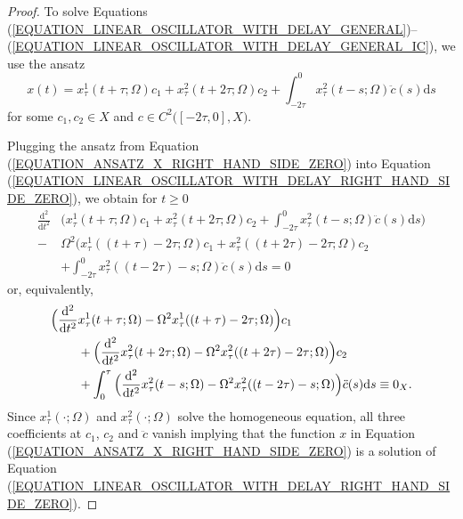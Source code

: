 \documentclass[12pt]{article}
\numberwithin{equation}{section}
\numberwithin{equation}{section}
\begin{document}
	\begin{proof}
		To solve Equations (\ref{EQUATION_LINEAR_OSCILLATOR_WITH_DELAY_GENERAL})--(\ref{EQUATION_LINEAR_OSCILLATOR_WITH_DELAY_GENERAL_IC}), we use the ansatz
		\begin{equation}
			x(t) = x^{1}_{\tau}(t + \tau; \Omega) c_{1} + x^{2}_{\tau}(t + 2\tau; \Omega) c_{2} + \int_{-2\tau}^{0} x^{2}_{\tau}(t - s; \Omega) \ddot{c}(s) \mathrm{d}s
			\label{EQUATION_ANSATZ_X_RIGHT_HAND_SIDE_ZERO}
		\end{equation}
		for some $c_{1}, c_{2} \in X$ and $c \in C^{2}\big([-2\tau, 0], X\big)$.

		Plugging the ansatz from Equation (\ref{EQUATION_ANSATZ_X_RIGHT_HAND_SIDE_ZERO}) into Equation (\ref{EQUATION_LINEAR_OSCILLATOR_WITH_DELAY_RIGHT_HAND_SIDE_ZERO}), we obtain for $t \geq 0$
		\begin{align*}
			\frac{\mathrm{d}^{2}}{\mathrm{d}t^{2}} 
			&\Big(x^{1}_{\tau}(t + \tau; \Omega) c_{1} + x^{2}_{\tau}(t + 2\tau; \Omega) c_{2} + \int_{-2\tau}^{0} x^{2}_{\tau}(t - s; \Omega) \ddot{c}(s) \mathrm{d}s\Big) \\
			-&\Omega^{2} \Big(x^{1}_{\tau}((t + \tau) - 2\tau; \Omega) c_{1} + x^{2}_{\tau}((t + 2\tau) - 2\tau; \Omega) c_{2} \\
			&+ \int_{-2\tau}^{0} x^{2}_{\tau}((t - 2\tau) - s; \Omega) \ddot{c}(s) \mathrm{d}s = 0
		\end{align*}
		or, equivalently,
		\begin{align*}
			\Big(\frac{\mathrm{d}^{2}}{\mathrm{d}t^{2}} &x^{1}_{\tau}(t + \tau; \Omega) - \Omega^{2} x^{1}_{\tau}((t + \tau) - 2\tau; \Omega)\Big) c_{1} \\
			&+ \Big(\frac{\mathrm{d}^{2}}{\mathrm{d}t^{2}} x^{2}_{\tau}(t + 2\tau; \Omega) - \Omega^{2} x^{2}_{\tau}((t + 2\tau) - 2\tau; \Omega)\Big) c_{2} \\
			&+ \int_{0}^{\tau} \Big(\frac{\mathrm{d}^{2}}{\mathrm{d}t^{2}} x^{2}_{\tau}(t - s; \Omega) - \Omega^{2} x^{2}_{\tau}((t - 2\tau) - s; \Omega)\Big) \ddot{c}(s) \mathrm{d}s \equiv 0_{X}. \notag
		\end{align*}
		Since $x^{1}_{\tau}(\cdot; \Omega)$ and $x^{2}_{\tau}(\cdot; \Omega)$ solve the homogeneous equation,
		all three coefficients at $c_{1}$, $c_{2}$ and $\ddot{c}$ vanish
		implying that the function $x$ in Equation (\ref{EQUATION_ANSATZ_X_RIGHT_HAND_SIDE_ZERO})
		is a solution of Equation (\ref{EQUATION_LINEAR_OSCILLATOR_WITH_DELAY_RIGHT_HAND_SIDE_ZERO}).


\end{proof}
\end{document}
